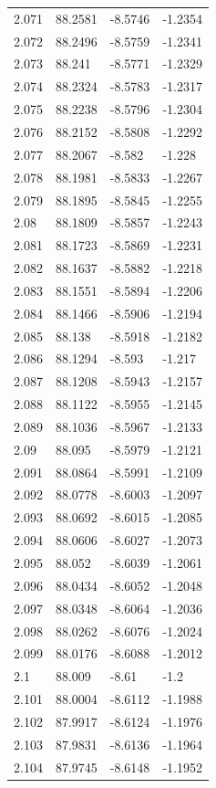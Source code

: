 \begin{tabular}{llll}
2.071 & 88.2581 & -8.5746 & -1.2354 \\
2.072 & 88.2496 & -8.5759 & -1.2341 \\
2.073 & 88.241 & -8.5771 & -1.2329 \\
2.074 & 88.2324 & -8.5783 & -1.2317 \\
2.075 & 88.2238 & -8.5796 & -1.2304 \\
2.076 & 88.2152 & -8.5808 & -1.2292 \\
2.077 & 88.2067 & -8.582 & -1.228 \\
2.078 & 88.1981 & -8.5833 & -1.2267 \\
2.079 & 88.1895 & -8.5845 & -1.2255 \\
2.08 & 88.1809 & -8.5857 & -1.2243 \\
2.081 & 88.1723 & -8.5869 & -1.2231 \\
2.082 & 88.1637 & -8.5882 & -1.2218 \\
2.083 & 88.1551 & -8.5894 & -1.2206 \\
2.084 & 88.1466 & -8.5906 & -1.2194 \\
2.085 & 88.138 & -8.5918 & -1.2182 \\
2.086 & 88.1294 & -8.593 & -1.217 \\
2.087 & 88.1208 & -8.5943 & -1.2157 \\
2.088 & 88.1122 & -8.5955 & -1.2145 \\
2.089 & 88.1036 & -8.5967 & -1.2133 \\
2.09 & 88.095 & -8.5979 & -1.2121 \\
2.091 & 88.0864 & -8.5991 & -1.2109 \\
2.092 & 88.0778 & -8.6003 & -1.2097 \\
2.093 & 88.0692 & -8.6015 & -1.2085 \\
2.094 & 88.0606 & -8.6027 & -1.2073 \\
2.095 & 88.052 & -8.6039 & -1.2061 \\
2.096 & 88.0434 & -8.6052 & -1.2048 \\
2.097 & 88.0348 & -8.6064 & -1.2036 \\
2.098 & 88.0262 & -8.6076 & -1.2024 \\
2.099 & 88.0176 & -8.6088 & -1.2012 \\
2.1 & 88.009 & -8.61 & -1.2 \\
2.101 & 88.0004 & -8.6112 & -1.1988 \\
2.102 & 87.9917 & -8.6124 & -1.1976 \\
2.103 & 87.9831 & -8.6136 & -1.1964 \\
2.104 & 87.9745 & -8.6148 & -1.1952 \\

\end{tabular}
